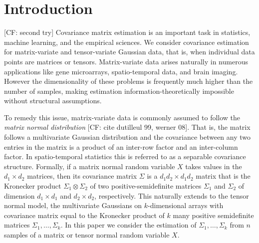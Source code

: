 \documentclass{article}
\newcommand{\ot}{\otimes}
\newcommand{\CF}[1]{{\color{purple}[CF: #1]}}
\begin{document}
\section{Introduction}
\CF{second try}
Covariance matrix estimation is an important task in statistics, machine learning, and the empirical sciences. We consider covariance estimation for matrix-variate and tensor-variate Gaussian data, that is, when individual data points are matrices or tensors. Matrix-variate data arises naturally in numerous applications like gene microarrays, spatio-temporal data, and brain imaging. However the dimensionality of these problems is frequently much higher than the number of samples, making estimation information-theoretically impossible without structural assumptions. 

To remedy this issue, matrix-variate data is commonly assumed to follow the \emph{matrix normal distribution} \CF{cite dutilleul 99, werner 08}. That is, the matrix follows a multivariate Gaussian distribution and the covariance between any two entries in the matrix is a product of an inter-row factor and an inter-column factor. In spatio-temporal statistics this is referred to as a separable covariance structure. Formally, if a matrix normal random variable $X$ takes values in the $d_1\times d_2$ matrices, then its covariance matrix $\Sigma$ is a $d_1d_2\times d_1 d_2$ matrix that is the Kronecker product $\Sigma_1 \ot \Sigma_2$ of two positive-semidefinite matrices $\Sigma_1$ and $\Sigma_2$ of dimension $d_1\times d_1$ and $d_2\times d_2$, respectively. This naturally extends to the tensor normal model, the multivariate Gaussians on $k$-dimensional arrays with covariance matrix equal to the Kronecker product of $k$ many positive semidefinite matrices $\Sigma_1, \dots, \Sigma_k$. In this paper we consider the estimation of $\Sigma_1, \dots, \Sigma_k$ from $n$ samples of a matrix or tensor normal random variable $X$. 
\end{document}

